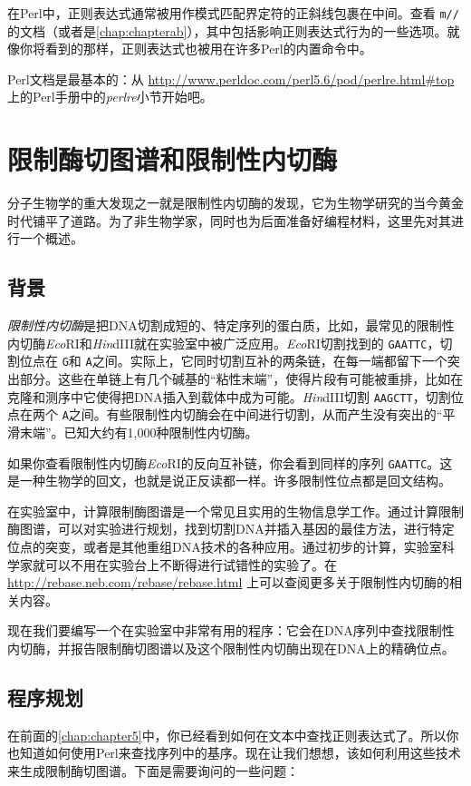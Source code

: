 在Perl中，正则表达式通常被用作模式匹配界定符的正斜线包裹在中间。查看 \verb|m//|的文档（或者是\autoref{chap:chapterab}），其中包括影响正则表达式行为的一些选项。就像你将看到的那样，正则表达式也被用在许多Perl的内置命令中。

Perl文档是最基本的：从 \href{http://www.perldoc.com/perl5.6/pod/perlre.html\#top}{http://www.perldoc.com/perl5.6/pod/perlre.html\#top} 上的Perl手册中的\textit{perlre}小节开始吧。

\section{限制酶切图谱和限制性内切酶}
分子生物学的重大发现之一就是限制性内切酶的发现，它为生物学研究的当今黄金时代铺平了道路。为了非生物学家，同时也为后面准备好编程材料，这里先对其进行一个概述。

\subsection{背景}
\textit{限制性内切酶}是把DNA切割成短的、特定序列的蛋白质，比如，最常见的限制性内切酶\textit{Eco}RI和\textit{Hin}dIII就在实验室中被广泛应用。\textit{Eco}RI切割找到的 \verb|GAATTC|，切割位点在 \verb|G|和 \verb|A|之间。实际上，它同时切割互补的两条链，在每一端都留下一个突出部分。这些在单链上有几个碱基的“粘性末端”，使得片段有可能被重排，比如在克隆和测序中它使得把DNA插入到载体中成为可能。\textit{Hin}dIII切割 \verb|AAGCTT|，切割位点在两个 \verb|A|之间。有些限制性内切酶会在中间进行切割，从而产生没有突出的“平滑末端”。已知大约有1,000种限制性内切酶。

如果你查看限制性内切酶\textit{Eco}RI的反向互补链，你会看到同样的序列 \verb|GAATTC|。这是一种生物学的回文，也就是说正反读都一样。许多限制性位点都是回文结构。

在实验室中，计算限制酶图谱是一个常见且实用的生物信息学工作。通过计算限制酶图谱，可以对实验进行规划，找到切割DNA并插入基因的最佳方法，进行特定位点的突变，或者是其他重组DNA技术的各种应用。通过初步的计算，实验室科学家就可以不用在实验台上不断得进行试错性的实验了。在 \href{http://rebase.neb.com/rebase/rebase.html}{http://rebase.neb.com/rebase/rebase.html} 上可以查阅更多关于限制性内切酶的相关内容。

现在我们要编写一个在实验室中非常有用的程序：它会在DNA序列中查找限制性内切酶，并报告限制酶切图谱以及这个限制性内切酶出现在DNA上的精确位点。

\subsection{程序规划}
在前面的\autoref{chap:chapter5}中，你已经看到如何在文本中查找正则表达式了。所以你也知道如何使用Perl来查找序列中的基序。现在让我们想想，该如何利用这些技术来生成限制酶切图谱。下面是需要询问的一些问题：

